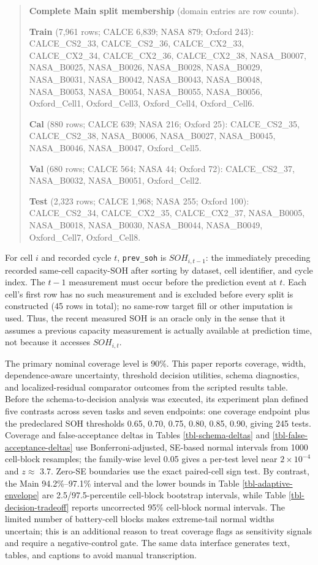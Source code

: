 \documentclass[
  number,
  preprint]{elsarticle}
\begin{document}
\begin{quote}
\scriptsize
\textbf{Complete Main split membership} (domain entries are row counts).\par
\textbf{Train} (7,961 rows; CALCE 6,839; NASA 879; Oxford 243): CALCE\_CS2\_33, CALCE\_CS2\_36, CALCE\_CX2\_33, CALCE\_CX2\_34, CALCE\_CX2\_36, CALCE\_CX2\_38, NASA\_B0007, NASA\_B0025, NASA\_B0026, NASA\_B0028, NASA\_B0029, NASA\_B0031, NASA\_B0042, NASA\_B0043, NASA\_B0048, NASA\_B0053, NASA\_B0054, NASA\_B0055, NASA\_B0056, Oxford\_Cell1, Oxford\_Cell3, Oxford\_Cell4, Oxford\_Cell6.

\textbf{Cal} (880 rows; CALCE 639; NASA 216; Oxford 25): CALCE\_CS2\_35, CALCE\_CS2\_38, NASA\_B0006, NASA\_B0027, NASA\_B0045, NASA\_B0046, NASA\_B0047, Oxford\_Cell5.

\textbf{Val} (680 rows; CALCE 564; NASA 44; Oxford 72): CALCE\_CS2\_37, NASA\_B0032, NASA\_B0051, Oxford\_Cell2.

\textbf{Test} (2,323 rows; CALCE 1,968; NASA 255; Oxford 100): CALCE\_CS2\_34, CALCE\_CX2\_35, CALCE\_CX2\_37, NASA\_B0005, NASA\_B0018, NASA\_B0030, NASA\_B0044, NASA\_B0049, Oxford\_Cell7, Oxford\_Cell8.
\end{quote}

For cell \(i\) and recorded cycle \(t\), \texttt{prev\_soh} is
\(SOH_{i,t-1}\): the immediately preceding recorded same-cell
capacity-SOH after sorting by dataset, cell identifier, and cycle index.
The \(t-1\) measurement must occur before the prediction event at \(t\).
Each cell's first row has no such measurement and is excluded before
every split is constructed (45 rows in total); no same-row target fill
or other imputation is used. Thus, the recent measured SOH is an oracle
only in the sense that it assumes a previous capacity measurement is
actually available at prediction time, not because it accesses
\(SOH_{i,t}\).

The primary nominal coverage level is 90\%. This paper reports coverage,
width, dependence-aware uncertainty, threshold decision utilities,
schema diagnostics, and localized-residual comparator outcomes from the
scripted results table. Before the schema-to-decision analysis was
executed, its experiment plan defined five contrasts across seven tasks
and seven endpoints: one coverage endpoint plus the predeclared SOH
thresholds 0.65, 0.70, 0.75, 0.80, 0.85, 0.90, giving 245 tests.
Coverage and false-acceptance deltas in Tables \ref{tbl-schema-deltas}
and \ref{tbl-false-acceptance-deltas} use Bonferroni-adjusted, SE-based
normal intervals from 1000 cell-block resamples; the family-wise level
0.05 gives a per-test level near \(2\times10^{-4}\) and \(z \approx\)
3.7. Zero-SE boundaries use the exact paired-cell sign test. By
contrast, the Main 94.2\%--97.1\% interval and the lower bounds in Table
\ref{tbl-adaptive-envelope} are 2.5/97.5-percentile cell-block bootstrap
intervals, while Table \ref{tbl-decision-tradeoff} reports uncorrected
95\% cell-block normal intervals. The limited number of battery-cell
blocks makes extreme-tail normal widths uncertain; this is an additional
reason to treat coverage flags as sensitivity signals and require a
negative-control gate. The same data interface generates text, tables,
and captions to avoid manual transcription.
\end{document}
